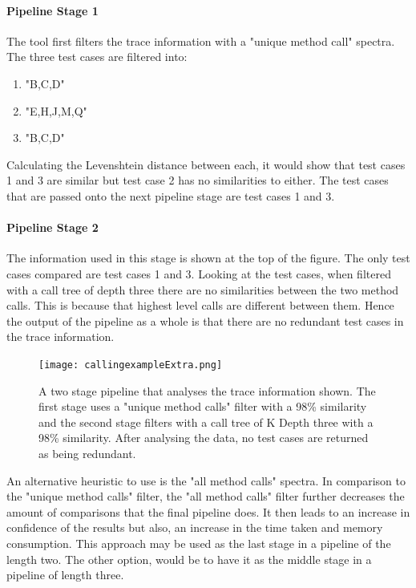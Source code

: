 \paragraph{Pipeline Stage 1}
The tool first filters the trace information with a "unique method call" spectra. The three test cases are filtered into:

\begin{enumerate}
\item "B,C,D" 
\item "E,H,J,M,Q"
\item "B,C,D"
\end{enumerate}

Calculating the Levenshtein distance between each, it would show that test cases 1 and 3 are similar but test case 2 has no similarities to either. The test cases that are passed onto the next pipeline stage are test cases 1 and 3.

\paragraph{Pipeline Stage 2}

The information used in this stage is shown at the top of the figure. The only test cases compared are test cases 1 and 3. Looking at the test cases, when filtered with a call tree of depth three there are no similarities between the two method calls. This is because that highest level calls are different between them. Hence the output of the pipeline as a whole is that there are no redundant test cases in the trace information.

\begin{figure}[h]
\texttt{[image: callingexampleExtra.png]}
\caption{A two stage pipeline that analyses the trace information shown. The first stage uses a "unique method calls" filter with a 98\% similarity and the second stage filters with a call tree of K Depth three with a 98\% similarity. After analysing the data, no test cases are returned as being redundant.}
\label{fig:pipelineExample}
\end{figure}

An alternative heuristic to use is the "all method calls" spectra. In comparison to the "unique method calls" filter, the "all method calls" filter further decreases the amount of comparisons that the final pipeline does. It then leads to an increase in confidence of the results but also, an increase in the time taken and memory consumption. This approach may be used as the last stage in a pipeline of the length two. The other option, would be to have it as the middle stage in a pipeline of length three.

